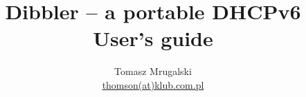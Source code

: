 \documentclass[11pt]{article}
\author{Tomasz Mrugalski\\ \small{\href{mailto:thomson(at)klub.com.pl}{thomson(at)klub.com.pl}}}
\date{\dzis}
\title{Dibbler -- a portable DHCPv6\\User's guide}
\begin{document}
\vspace{-4cm}
\maketitle
\vspace{-1cm}

\begin{center}
  
\end{center}

\newpage
\tableofcontents

\newpage










\end{document}
